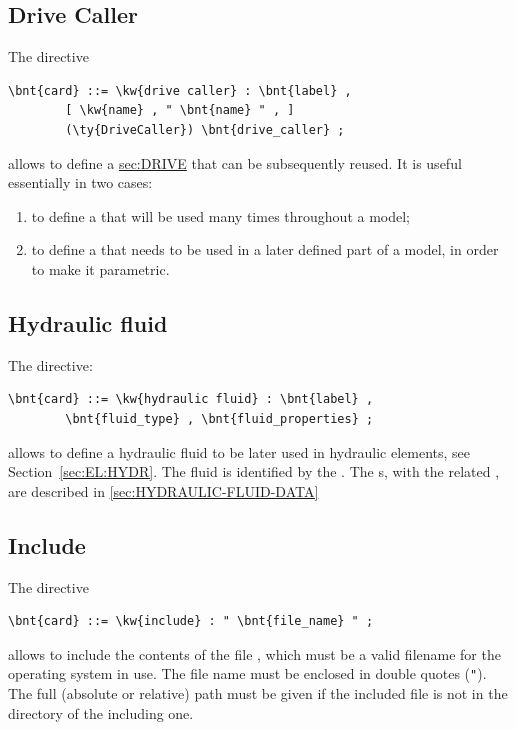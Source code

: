 \subsection{Drive Caller}\label{sec:DRIVE-CALLER}
The  directive
\begin{Verbatim}[commandchars=\\\{\}]
    \bnt{card} ::= \kw{drive caller} : \bnt{label} ,
        [ \kw{name} , " \bnt{name} " , ]
        (\ty{DriveCaller}) \bnt{drive_caller} ;
\end{Verbatim}
allows to define
a \hyperref{\kw{drive caller}}{\kw{drive caller} (see Section~}{)}{sec:DRIVE}
that can be subsequently reused.
It is useful essentially in two cases:
\begin{enumerate}
	\renewcommand{\labelenumi}{\alph{enumi})}
	\item to define a 
	that will be used many times throughout a model;
	\item to define a  
	that needs to be used in a later defined part of a model, 
	in order to make it parametric.
\end{enumerate}



\subsection{Hydraulic fluid}\label{sec:HYDRAULIC-FLUID}
The  directive:
\begin{Verbatim}[commandchars=\\\{\}]
    \bnt{card} ::= \kw{hydraulic fluid} : \bnt{label} , 
        \bnt{fluid_type} , \bnt{fluid_properties} ;
\end{Verbatim}
allows to define a hydraulic fluid to be later used in hydraulic elements,
see Section~\ref{sec:EL:HYDR}.
The fluid is identified by the . 
The s, with the related , are
described in \ref{sec:HYDRAULIC-FLUID-DATA}



\subsection{Include}\label{sec:INCLUDE}
The  directive
\begin{Verbatim}[commandchars=\\\{\}]
    \bnt{card} ::= \kw{include} : " \bnt{file_name} " ;
\end{Verbatim}
allows to include the contents of the file
,
which must be a valid filename for the operating system in
use.
The file name must be enclosed in double quotes (\texttt{"}).
The full (absolute or relative) path must be given if the included file 
is not in the directory of the including one.

